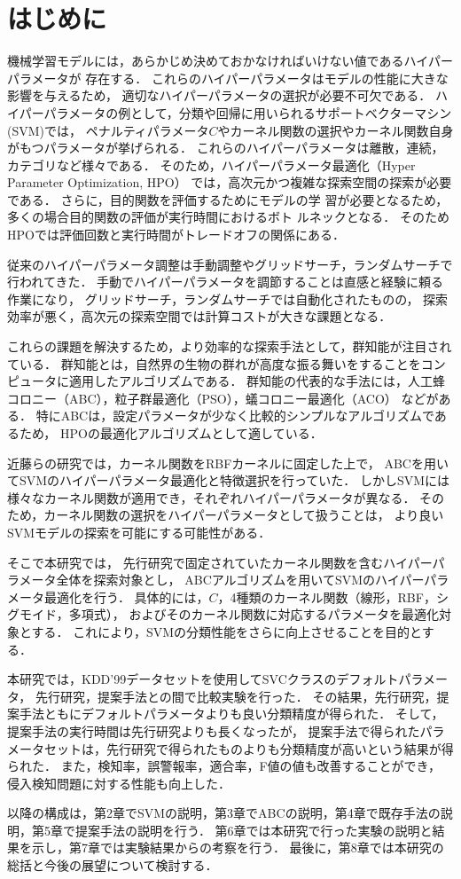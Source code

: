 \section{はじめに}
機械学習モデルには，あらかじめ決めておかなければいけない値であるハイパーパラメータが
存在する．
これらのハイパーパラメータはモデルの性能に大きな影響を与えるため，
適切なハイパーパラメータの選択が必要不可欠である\cite{essential}．
ハイパーパラメータの例として，分類や回帰に用いられるサポートベクターマシン(SVM)では，
ペナルティパラメータ$C$やカーネル関数の選択やカーネル関数自身がもつパラメータが挙げられる．
これらのハイパーパラメータは離散，連続，カテゴリなど様々である．
そのため，ハイパーパラメータ最適化（Hyper Parameter Optimization, HPO）
では，高次元かつ複雑な探索空間の探索が必要である．
さらに，目的関数を評価するためにモデルの学
習が必要となるため，
多くの場合目的関数の評価が実行時間におけるボト
ルネックとなる．
そのためHPOでは評価回数と実行時間がトレードオフの関係にある\cite{trade}．

従来のハイパーパラメータ調整は手動調整やグリッドサーチ，ランダムサーチで行われてきた．
手動でハイパーパラメータを調節することは直感と経験に頼る作業になり，
グリッドサーチ，ランダムサーチでは自動化されたものの，
探索効率が悪く，高次元の探索空間では計算コストが大きな課題となる\cite{trade}．

これらの課題を解決するため，より効率的な探索手法として，群知能が注目されている．
群知能とは，自然界の生物の群れが高度な振る舞いをすることをコンピュータに適用したアルゴリズムである\cite{population}．
群知能の代表的な手法には，人工蜂コロニー（ABC），粒子群最適化（PSO），蟻コロニー最適化（ACO）
などがある．
特にABCは，設定パラメータが少なく比較的シンプルなアルゴリズムであるため，
HPOの最適化アルゴリズムとして適している．

近藤らの研究\cite{origin}では，カーネル関数をRBFカーネルに固定した上で，
ABCを用いてSVMのハイパーパラメータ最適化と特徴選択を行っていた．
しかしSVMには様々なカーネル関数が適用でき，それぞれハイパーパラメータが異なる．
そのため，カーネル関数の選択をハイパーパラメータとして扱うことは，
より良いSVMモデルの探索を可能にする可能性がある．

そこで本研究では，
先行研究で固定されていたカーネル関数を含むハイパーパラメータ全体を探索対象とし，
ABCアルゴリズムを用いてSVMのハイパーパラメータ最適化を行う．
具体的には，$C$，4種類のカーネル関数（線形，RBF，シグモイド，多項式），
およびそのカーネル関数に対応するパラメータを最適化対象とする．
これにより，SVMの分類性能をさらに向上させることを目的とする．

本研究では，KDD'99データセットを使用してSVCクラスのデフォルトパラメータ，
先行研究，提案手法との間で比較実験を行った．
その結果，先行研究，提案手法ともにデフォルトパラメータよりも良い分類精度が得られた．
そして，提案手法の実行時間は先行研究よりも長くなったが，
提案手法で得られたパラメータセットは，先行研究で得られたものよりも分類精度が高いという結果が得られた．
また，検知率，誤警報率，適合率，F値の値も改善することができ，
侵入検知問題に対する性能も向上した．

以降の構成は，第2章でSVMの説明，第3章でABCの説明，第4章で既存手法の説明，第5章で提案手法の説明を行う．
第6章では本研究で行った実験の説明と結果を示し，第7章では実験結果からの考察を行う．
最後に，第8章では本研究の総括と今後の展望について検討する．
